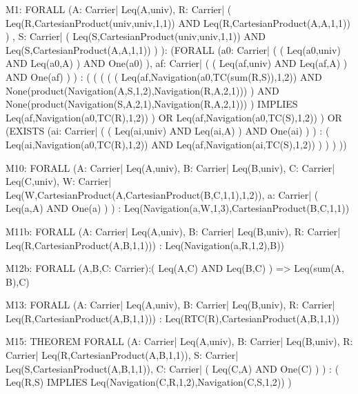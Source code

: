 \begin{verbnobox}[\tiny]
M1:
	FORALL (A: Carrier| Leq(A,univ),
		   R: Carrier|  ( Leq(R,CartesianProduct(univ,univ,1,1)) AND Leq(R,CartesianProduct(A,A,1,1)) ) ,
		   S: Carrier|  ( Leq(S,CartesianProduct(univ,univ,1,1)) AND Leq(S,CartesianProduct(A,A,1,1)) ) ):
	  (FORALL (a0: Carrier|  (  ( Leq(a0,univ) AND Leq(a0,A) )  AND One(a0) ), 
			   af: Carrier|  (  ( Leq(af,univ) AND Leq(af,A) )  AND One(af) ) ) : 
		  ( ( ( ( ( Leq(af,Navigation(a0,TC(sum(R,S)),1,2)) AND
			None(product(Navigation(A,S,1,2),Navigation(R,A,2,1))) ) AND
		    None(product(Navigation(S,A,2,1),Navigation(R,A,2,1))) )
		  IMPLIES 
			Leq(af,Navigation(a0,TC(R),1,2)) ) OR 
			Leq(af,Navigation(a0,TC(S),1,2)) ) OR
			(EXISTS (ai: Carrier|  (  ( Leq(ai,univ) AND Leq(ai,A) )  AND One(ai) ) ) : 
				( Leq(ai,Navigation(a0,TC(R),1,2)) AND Leq(af,Navigation(ai,TC(S),1,2)) ) ) ) ))
\end{verbnobox}

\begin{verbnobox}[\tiny]
M10:
	FORALL (A: Carrier| Leq(A,univ), 
		   B: Carrier| Leq(B,univ), 
		   C: Carrier| Leq(C,univ), 
		   W: Carrier| Leq(W,CartesianProduct(A,CartesianProduct(B,C,1,1),1,2)), 
		   a: Carrier| ( Leq(a,A) AND One(a) ) ) : 
	  Leq(Navigation(a,W,1,3),CartesianProduct(B,C,1,1))

\end{verbnobox}

\begin{verbnobox}[\tiny]
M11b:	
	FORALL (A: Carrier| Leq(A,univ), 
		   B: Carrier| Leq(B,univ), 
		   R: Carrier| Leq(R,CartesianProduct(A,B,1,1))) : Leq(Navigation(a,R,1,2),B))
\end{verbnobox}

\begin{verbnobox}[\tiny]
M12b:
 FORALL (A,B,C: Carrier):( Leq(A,C) AND Leq(B,C) ) => Leq(sum(A, B),C)
\end{verbnobox}

\begin{verbnobox}[\tiny]
M13:	
	FORALL (A: Carrier| Leq(A,univ), 
		   B: Carrier| Leq(B,univ), 
		   R: Carrier| Leq(R,CartesianProduct(A,B,1,1))) : 
	  Leq(RTC(R),CartesianProduct(A,B,1,1))
\end{verbnobox}

\begin{verbnobox}[\tiny]
M15:
	THEOREM FORALL (A: Carrier| Leq(A,univ), 
				   B: Carrier| Leq(B,univ), 
				   R: Carrier| Leq(R,CartesianProduct(A,B,1,1)), 
				   S: Carrier| Leq(S,CartesianProduct(A,B,1,1)), 
				   C: Carrier| ( Leq(C,A) AND One(C) ) ) :  
			( Leq(R,S) IMPLIES Leq(Navigation(C,R,1,2),Navigation(C,S,1,2)) )
\end{verbnobox}

